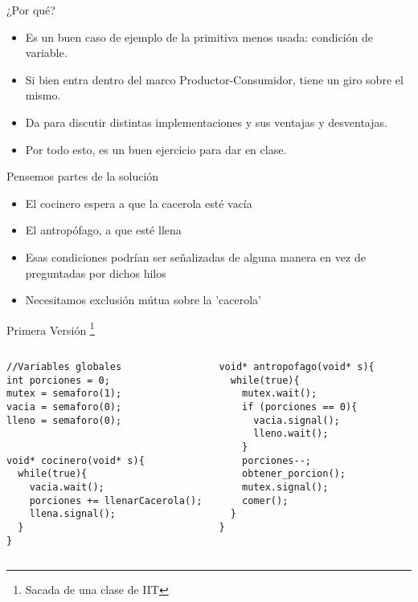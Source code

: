 \documentclass[presentation]{beamer}
\begin{document}
\begin{frame}{¿Por qué?}

\begin{itemize}
\item Es un buen caso de ejemplo de la primitiva menos usada: condición de variable.

\item Si bien entra dentro del marco Productor-Consumidor, tiene un giro sobre el mismo.

\item Da para discutir distintas implementaciones y sus ventajas y desventajas.

\item Por todo esto, es un buen ejercicio para dar en clase.


\end{itemize}

\end{frame}

\begin{frame}{Pensemos partes de la solución}

\begin{itemize}
\item El cocinero espera a que la cacerola esté vacía
\pause

\item El antropófago, a que esté llena
\pause
\item Esas condiciones podrían ser señalizadas de alguna manera en vez de preguntadas por dichos hilos
\pause
\item Necesitamos exclusión mútua sobre la 'cacerola'
\end{itemize}

\end{frame}


\begin{frame}[fragile]{Primera Versión \footnote{Sacada de una clase de IIT}}

\lstset{language=C++, basicstyle=\scriptsize}

\begin{columns}
 
\begin{lstlisting}
//Variables globales
int porciones = 0;
mutex = semaforo(1);
vacia = semaforo(0);
lleno = semaforo(0);


void* cocinero(void* s){
  while(true){
    vacia.wait();
    porciones += llenarCacerola();
    llena.signal();
  }
}
\end{lstlisting}
 
\begin{lstlisting}
void* antropofago(void* s){
  while(true){
    mutex.wait();
    if (porciones == 0){
      vacia.signal();
      lleno.wait();
    }
    porciones--;
    obtener_porcion();
    mutex.signal();
    comer();
  }
}
\end{lstlisting}
\end{columns}





\end{frame}
\end{document}
